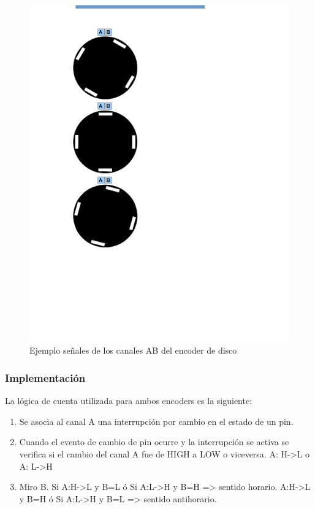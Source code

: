 \begin{figure}[!ht]
	\centering
	\includegraphics[width=15cm,scale=1]{resources/3_24-encoderDiscoAB.png}
	\caption{Ejemplo señales de los canales AB del encoder de disco}
	\label{fig:\thefigure}
\end{figure}

\subsubsection{Implementación}
 La lógica de cuenta utilizada para ambos encoders es la siguiente:
\begin{enumerate}
	\item Se asocia al canal A una interrupción por cambio en el estado de un pin.
	\item Cuando el evento de cambio de pin ocurre y la interrupción se activa se verifica si el cambio del canal A fue de HIGH a LOW o viceversa. A: H->L o A: L->H
	\item Miro B. Si A:H->L y B=L ó Si A:L->H y B=H => sentido horario. A:H->L y B=H ó Si A:L->H y B=L => sentido antihorario.
\end{enumerate}

